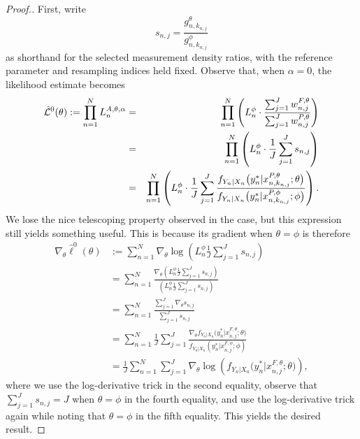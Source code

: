 \begin{proof}[Proof.]
First, write
\begin{equation}
s_{n,j} = \frac{g_{n,k_{n,j}}^\theta}{g_{n,k_{n,j}}^\phi}
\end{equation}
as shorthand for the selected measurement density ratios, with the
reference parameter and resampling indices held fixed.
Observe that, when $\alpha=0$, the likelihood estimate becomes
\begin{eqnarray}
    \hat{\mathcal{L}}^0(\theta) := \prod_{n=1}^N L_n^{A, \theta, \alpha} &=& \prod_{n=1}^N\left(L_n^\phi \cdot \frac{\sum_{j=1}^J w_{n,j}^{F,\theta}}{\sum_{j=1}^J w_{n,j}^{P,\theta}}\right)
    \\
    &=& \prod_{n=1}^N\left(L_n^\phi \cdot \frac{1}{J}\sum_{j=1}^J s_{n,j}\right)
    \\
    &=& \prod_{n=1}^N\left(L_n^\phi \cdot \frac{1}{J}\sum_{j=1}^J \frac{f_{Y_n|X_n}\big(y_n^*|x_{n,k_{n,j}}^{P, \theta};\theta\big)}{f_{Y_n|X_n}\big(y_n^*|x_{n,k_{n,j}}^{P, \phi};\phi\big)}\right).
\end{eqnarray}
We lose the nice telescoping property observed in the  case, but this expression still yields something useful. 
This is because its gradient when $\theta=\phi$ is therefore 
\begin{align}
    \nabla_\theta \hat{\ell}^0(\theta) &:= \sum_{n=1}^N \nabla_\theta \log\left(L_n^\phi \frac{1}{J} \sum_{j=1}^J s_{n,j}\right) \\
    &= \sum_{n=1}^N \frac{\nabla_\theta \left(L_n^\phi \frac{1}{J} \sum_{j=1}^J s_{n,j}\right)}{\left(L_n^\phi \frac{1}{J} \sum_{j=1}^J s_{n,j}\right)} \\
    &= \sum_{n=1}^N \frac{\sum_{j=1}^J \nabla_\theta s_{n,j}}{\sum_{j=1}^J s_{n,j}} \\
    &= \sum_{n=1}^N \frac{1}{J} \sum_{j=1}^J \frac{\nabla_\theta f_{Y_n|X_{n}}\big(y_n^*|x_{n,j}^{F, \theta}; \theta\big)}{f_{Y_n|X_{n}}(y_n^*|x_{n,j}^{F, \phi}; \phi)} \\
    &= \frac{1}{J} \sum_{n=1}^N \sum_{j=1}^J \nabla_\theta \log\left(f_{Y_n|X_{n}}\big(y_n^*|x_{n,j}^{F, \theta}; \theta\big)\right),
\end{align}
where we use the log-derivative trick in the second equality, observe that $\sum_{j=1}^J s_{n,j} = J$ when $\theta=\phi$ in the fourth equality, and use the log-derivative trick again while noting that $\theta=\phi$ in the fifth equality. This yields the desired result.
\end{proof}



